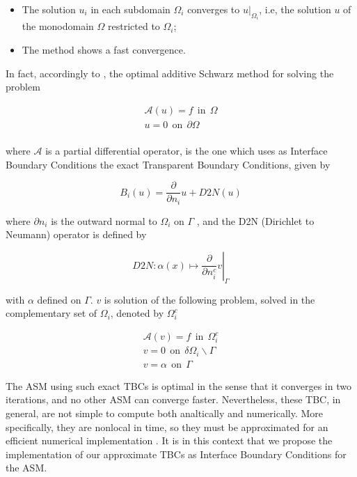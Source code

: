 \begin{itemize}
\item The solution $u_i$ in each subdomain $\Omega_i$ converges to $u|_{\Omega_i}$, i.e, the solution $u$ of the monodomain $\Omega$ restricted to $\Omega_i$;
\item The method shows a fast convergence.
\end{itemize} 

\indent In fact, accordingly to \cite{Japhet2013}, the optimal additive Schwarz method for solving the problem 

\begin{gather*}
\mathcal{A}(u) = f \ \ \text{in} \ \ \Omega\\
u = 0 \ \ \text{on} \ \ \partial\Omega\\
\end{gather*}

\noindent where $\mathcal{A}$ is a partial differential operator, is the one which uses as Interface Boundary Conditions the exact Transparent Boundary Conditions, given by

$$B_i(u) = \frac{\partial}{\partial n_i}u + D2N(u)$$

\noindent where $\partial n_i$ is the outward normal to $\Omega_i$ on $\Gamma$ , and the D2N (Dirichlet to Neumann) operator is defined by

$$\left. D2N : \alpha(x) \mapsto \frac{\partial}{\partial n_i^c}v \right\rvert_\Gamma$$

\noindent with $\alpha$ defined on $\Gamma$. $v$ is solution of the following problem, solved in the complementary set of $\Omega_i$, denoted by $\Omega_i^c$

\begin{gather*}
\mathcal{A}(v) = f \ \ \text{in} \ \ \Omega_i^c\\
v = 0 \ \ \text{on} \ \ \delta \Omega_i \backslash \Gamma \\
v = \alpha \ \ \text{on} \ \ \Gamma
\end{gather*}

\indent The ASM using such exact TBCs is optimal in the sense that it converges in two iterations, and no other ASM can converge faster. Nevertheless, these TBC, in general, are not simple to compute both analtically and numerically. More specifically, they are nonlocal in time, so they must be approximated for an efficient numerical implementation \cite{Xavieretal2008}. It is in this context that we propose the implementation of our approximate TBCs as Interface Boundary Conditions for the ASM.

